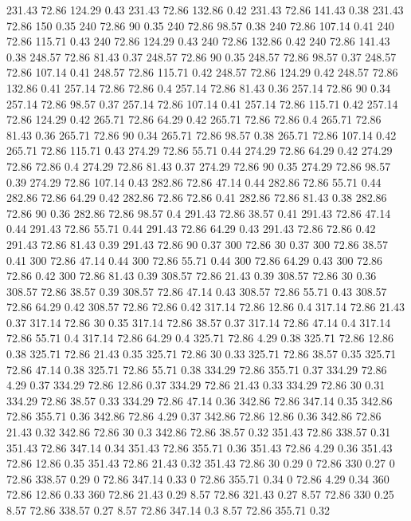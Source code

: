 231.43	72.86	124.29	0.43
231.43	72.86	132.86	0.42
231.43	72.86	141.43	0.38
231.43	72.86	150	0.35
240	72.86	90	0.35
240	72.86	98.57	0.38
240	72.86	107.14	0.41
240	72.86	115.71	0.43
240	72.86	124.29	0.43
240	72.86	132.86	0.42
240	72.86	141.43	0.38
248.57	72.86	81.43	0.37
248.57	72.86	90	0.35
248.57	72.86	98.57	0.37
248.57	72.86	107.14	0.41
248.57	72.86	115.71	0.42
248.57	72.86	124.29	0.42
248.57	72.86	132.86	0.41
257.14	72.86	72.86	0.4
257.14	72.86	81.43	0.36
257.14	72.86	90	0.34
257.14	72.86	98.57	0.37
257.14	72.86	107.14	0.41
257.14	72.86	115.71	0.42
257.14	72.86	124.29	0.42
265.71	72.86	64.29	0.42
265.71	72.86	72.86	0.4
265.71	72.86	81.43	0.36
265.71	72.86	90	0.34
265.71	72.86	98.57	0.38
265.71	72.86	107.14	0.42
265.71	72.86	115.71	0.43
274.29	72.86	55.71	0.44
274.29	72.86	64.29	0.42
274.29	72.86	72.86	0.4
274.29	72.86	81.43	0.37
274.29	72.86	90	0.35
274.29	72.86	98.57	0.39
274.29	72.86	107.14	0.43
282.86	72.86	47.14	0.44
282.86	72.86	55.71	0.44
282.86	72.86	64.29	0.42
282.86	72.86	72.86	0.41
282.86	72.86	81.43	0.38
282.86	72.86	90	0.36
282.86	72.86	98.57	0.4
291.43	72.86	38.57	0.41
291.43	72.86	47.14	0.44
291.43	72.86	55.71	0.44
291.43	72.86	64.29	0.43
291.43	72.86	72.86	0.42
291.43	72.86	81.43	0.39
291.43	72.86	90	0.37
300	72.86	30	0.37
300	72.86	38.57	0.41
300	72.86	47.14	0.44
300	72.86	55.71	0.44
300	72.86	64.29	0.43
300	72.86	72.86	0.42
300	72.86	81.43	0.39
308.57	72.86	21.43	0.39
308.57	72.86	30	0.36
308.57	72.86	38.57	0.39
308.57	72.86	47.14	0.43
308.57	72.86	55.71	0.43
308.57	72.86	64.29	0.42
308.57	72.86	72.86	0.42
317.14	72.86	12.86	0.4
317.14	72.86	21.43	0.37
317.14	72.86	30	0.35
317.14	72.86	38.57	0.37
317.14	72.86	47.14	0.4
317.14	72.86	55.71	0.4
317.14	72.86	64.29	0.4
325.71	72.86	4.29	0.38
325.71	72.86	12.86	0.38
325.71	72.86	21.43	0.35
325.71	72.86	30	0.33
325.71	72.86	38.57	0.35
325.71	72.86	47.14	0.38
325.71	72.86	55.71	0.38
334.29	72.86	355.71	0.37
334.29	72.86	4.29	0.37
334.29	72.86	12.86	0.37
334.29	72.86	21.43	0.33
334.29	72.86	30	0.31
334.29	72.86	38.57	0.33
334.29	72.86	47.14	0.36
342.86	72.86	347.14	0.35
342.86	72.86	355.71	0.36
342.86	72.86	4.29	0.37
342.86	72.86	12.86	0.36
342.86	72.86	21.43	0.32
342.86	72.86	30	0.3
342.86	72.86	38.57	0.32
351.43	72.86	338.57	0.31
351.43	72.86	347.14	0.34
351.43	72.86	355.71	0.36
351.43	72.86	4.29	0.36
351.43	72.86	12.86	0.35
351.43	72.86	21.43	0.32
351.43	72.86	30	0.29
0	72.86	330	0.27
0	72.86	338.57	0.29
0	72.86	347.14	0.33
0	72.86	355.71	0.34
0	72.86	4.29	0.34
360	72.86	12.86	0.33
360	72.86	21.43	0.29
8.57	72.86	321.43	0.27
8.57	72.86	330	0.25
8.57	72.86	338.57	0.27
8.57	72.86	347.14	0.3
8.57	72.86	355.71	0.32
